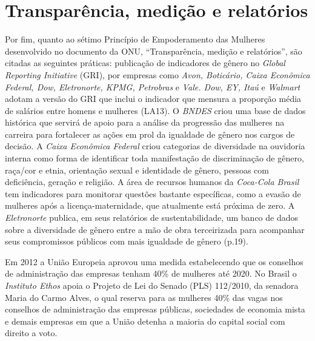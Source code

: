 \section{Transparência, medição e relatórios}

Por fim, quanto ao sétimo Princípio de Empoderamento das Mulheres
desenvolvido no documento da ONU, ``Transparência, medição e
relatórios'', são citadas as seguintes práticas: publicação de
indicadores de gênero no \emph{Global Reporting Initiative} (GRI), por
empresas como \emph{Avon, Boticário, Caixa Econômica Federal, Dow,
Eletronorte, KPMG, Petrobras} e \emph{Vale. Dow, EY, Itaú} e
\emph{Walmart} adotam a versão do GRI que inclui o indicador que mensura
a proporção média de salários entre homens e mulheres (LA13). O
\emph{BNDES} criou uma base de dados histórica que servirá de apoio para
a análise da progressão das mulheres na carreira para fortalecer as
ações em prol da igualdade de gênero nos cargos de decisão. A
\emph{Caixa Econômica Federal} criou categorias de diversidade na
ouvidoria interna como forma de identificar toda manifestação de
discriminação de gênero, raça/cor e etnia, orientação sexual e
identidade de gênero, pessoas com deficiência, geração e religião. A
área de recursos humanos da \emph{Coca-Cola Brasil} tem indicadores para
monitorar questões bastante específicas, como a evasão de mulheres após
a licença-maternidade, que atualmente está próxima de zero. A
\emph{Eletronorte} publica, em seus relatórios de sustentabilidade, um
banco de dados sobre a diversidade de gênero entre a mão de obra
terceirizada para acompanhar seus compromissos públicos com mais
igualdade de gênero (p.19).

Em 2012 a União Europeia aprovou uma medida estabelecendo que os
conselhos de administração das empresas tenham 40\% de mulheres até
2020. No Brasil o \emph{Instituto Ethos} apoia o Projeto de Lei do
Senado (PLS) 112/2010, da senadora Maria do Carmo Alves, o qual reserva
para as mulheres 40\% das vagas nos conselhos de administração das
empresas públicas, sociedades de economia mista e demais empresas em que
a União detenha a maioria do capital social com direito a voto.

